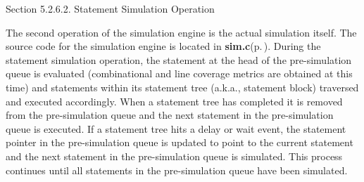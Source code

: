 \begin{Desc}
\item[Section 5.2.6.2. Statement Simulation Operation]\end{Desc}
\begin{Desc}
\item[]The second operation of the simulation engine is the actual simulation itself. The source code for the simulation engine is located in {\bf sim.c}{\rm (p.\,\pageref{sim_8c})}. During the statement simulation operation, the statement at the head of the pre-simulation queue is evaluated (combinational and line coverage metrics are obtained at this time) and statements within its statement tree (a.k.a., statement block) traversed and executed accordingly. When a statement tree has completed it is removed from the pre-simulation queue and the next statement in the pre-simulation queue is executed. If a statement tree hits a delay or wait event, the statement pointer in the pre-simulation queue is updated to point to the current statement and the next statement in the pre-simulation queue is simulated. This process continues until all statements in the pre-simulation queue have been simulated.\end{Desc}




